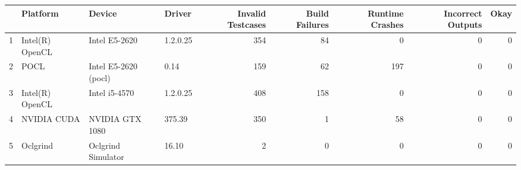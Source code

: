 \begin{tabular}{llllrrrrr}
\toprule
{} &         Platform &                Device &    Driver &  Invalid Testcases &  Build Failures &  Runtime Crashes &  Incorrect Outputs &  Okay \\
\midrule
1 &  Intel(R) OpenCL &         Intel E5-2620 &  1.2.0.25 &                354 &              84 &                0 &                  0 &     0 \\
2 &             POCL &  Intel E5-2620 (pocl) &      0.14 &                159 &              62 &              197 &                  0 &     0 \\
3 &  Intel(R) OpenCL &         Intel i5-4570 &  1.2.0.25 &                408 &             158 &                0 &                  0 &     0 \\
4 &      NVIDIA CUDA &       NVIDIA GTX 1080 &    375.39 &                350 &               1 &               58 &                  0 &     0 \\
5 &         Oclgrind &    Oclgrind Simulator &     16.10 &                  2 &               0 &                0 &                  0 &     0 \\
\bottomrule
\end{tabular}

